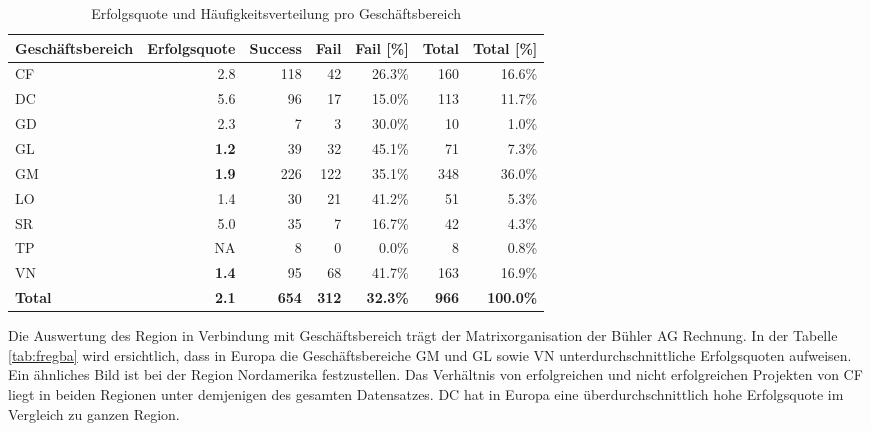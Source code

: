\begin{table}[H]
	\centering
	\caption{Erfolgsquote und Häufigkeitsverteilung pro Geschäftsbereich}
	\begin{tabular}{lrrrrrr}
		\toprule
		\textbf{Geschäftsbereich}   & \multicolumn{1}{l}{\textbf{Erfolgsquote}} & \multicolumn{1}{l}{\textbf{Success}} & \multicolumn{1}{l}{\textbf{Fail}} & \multicolumn{1}{l}{\textbf{Fail [\%]}} & \multicolumn{1}{l}{\textbf{Total}} & \multicolumn{1}{l}{\textbf{Total [\%]}} \\
		\midrule
		CF    & 2.8   & 118   & 42    & 26.3\% & 160   & 16.6\% \\
		DC    & 5.6   & 96    & 17    & 15.0\% & 113   & 11.7\% \\
		GD    & 2.3   & 7     & 3     & 30.0\% & 10    & 1.0\% \\
		GL    & \textbf{1.2}  & 39    & 32    & 45.1\% & 71    & 7.3\% \\
		GM    & \textbf{1.9}   & 226   & 122   & 35.1\% & 348   & 36.0\% \\
		LO    & 1.4   & 30    & 21    & 41.2\% & 51    & 5.3\% \\
		SR    & 5.0   & 35    & 7     & 16.7\% & 42    & 4.3\% \\
		TP    & NA      & 8     & 0     & 0.0\% & 8     & 0.8\% \\
		VN    & \textbf{1.4}   & 95    & 68    & 41.7\% & 163   & 16.9\% \\
		\bottomrule
		\textbf{Total } & \textbf{2.1} & \textbf{654} & \textbf{312} & \textbf{32.3\%} & \textbf{966} & \textbf{100.0\%} \\
	\end{tabular}%
	\label{tab:fba}%
\end{table}%
Die Auswertung des Region in Verbindung mit Geschäftsbereich trägt der Matrixorganisation der Bühler AG Rechnung. In der Tabelle \ref{tab:fregba} wird ersichtlich, dass in Europa die Geschäftsbereiche GM und GL sowie VN unterdurchschnittliche Erfolgsquoten aufweisen. Ein ähnliches Bild ist bei der Region Nordamerika festzustellen. Das Verhältnis von erfolgreichen und nicht erfolgreichen Projekten von CF liegt in beiden Regionen unter demjenigen des gesamten Datensatzes. DC hat in Europa eine überdurchschnittlich hohe Erfolgsquote im Vergleich zu ganzen Region.
